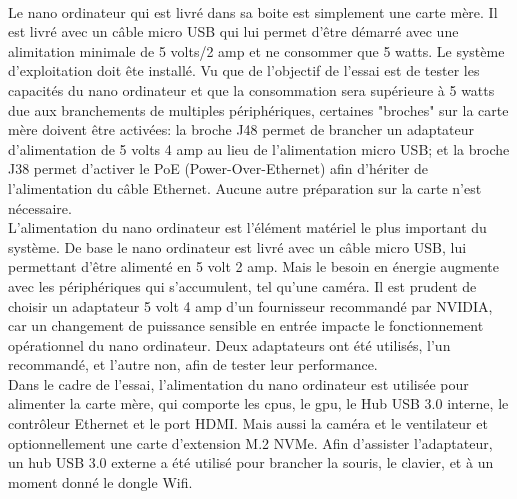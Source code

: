 \vspace{\baselineskip}
\\
\noindent Le nano ordinateur qui est livré dans sa boite est simplement une carte mère. Il est livré avec un câble micro USB qui lui permet d'être démarré avec une alimitation minimale de 5 volts/2 amp et ne consommer que 5 watts. Le système d'exploitation doit ête installé. Vu que de l'objectif de l'essai est de tester les capacités du nano ordinateur et que la consommation sera supérieure à 5 watts due aux branchements de multiples périphériques, certaines "broches" sur la carte mère doivent être activées: la broche J48 permet de brancher un adaptateur d'alimentation de 5 volts 4 amp au lieu de l'alimentation micro USB; et la broche J38 permet d'activer le PoE (Power-Over-Ethernet) afin d'hériter de l'alimentation du câble Ethernet. Aucune autre préparation sur la carte n'est nécessaire.
{
\vspace{\baselineskip}
\\
\noindent L'alimentation du nano ordinateur est l'élément matériel le plus important du système. De base le nano ordinateur est livré avec un câble micro USB, lui permettant d'être alimenté en 5 volt 2 amp. Mais le besoin en énergie augmente avec les périphériques qui s'accumulent, tel qu'une caméra. Il est prudent de choisir un adaptateur 5 volt 4 amp d'un fournisseur recommandé par NVIDIA, car un changement de puissance sensible en entrée impacte le fonctionnement opérationnel du nano ordinateur. Deux adaptateurs ont été utilisés, l'un recommandé, et l'autre non, afin de tester leur performance. 
\vspace{\baselineskip}
\\
\noindent Dans le cadre de l'essai, l'alimentation du nano ordinateur est utilisée pour alimenter la carte mère, qui comporte les \acrshort{cpu}s, le \acrshort{gpu}, le Hub USB 3.0 interne, le contrôleur Ethernet et le port HDMI. Mais aussi la caméra et le ventilateur et optionnellement une carte d'extension M.2 NVMe. Afin d'assister l'adaptateur, un hub USB 3.0 externe a été utilisé pour brancher la souris, le clavier, et à un moment donné le dongle Wifi.
}
